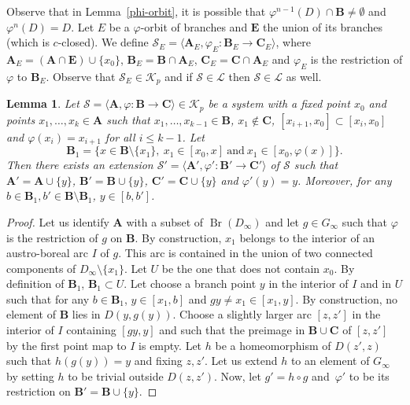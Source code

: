 \documentclass[JEP,XML,SOM,Unicode,NoFloatCountersInSection]{cedram}
\let\mathcal\mathscr
\theoremstyle{plain}
\newtheorem{lem}[thm]{Lemma}
\theoremstyle{definition}
\newcommand{\bA}{{\boldsymbol{A}}}
\newcommand{\bB}{{\boldsymbol{B}}}
\newcommand{\bC}{{\boldsymbol{C}}}
\newcommand{\bE}{{\boldsymbol{E}}}
\newcommand{\cK}{\mathcal{K}}
\newcommand{\cL}{\mathcal{L}}
\newcommand{\cS}{\mathcal{S}}
\DeclareMathOperator{\Br}{Br}
\begin{document}
Observe that in Lemma~\ref{phi-orbit}, it is possible that $\varphi^{n-1}(D)\cap\bB\neq\emptyset$ and $\varphi^n(D)=D$.
Let $E$ be a $\varphi$-orbit of branches and $\bE$ the union of its branches (which is $c$-closed). We define $\cS_E=\langle \bA_E,\varphi_E\colon \bB_E\to \bC_E\rangle$, where $\bA_E=(\bA\cap \bE)\cup\{x_0\}$, $\bB_E=\bB\cap\bA_E$, $\bC_E=\bC\cap\bA_E$ and $\varphi_E$ is the restriction of $\varphi$ to $\bB_E$. Observe
that $\cS_E\in\cK_p$ and if $\cS\in\cL$ then $\cS\in\cL$ as well.

\begin{lem}\label{lem:addfixedpoint} Let $\cS=\langle \bA,\varphi\colon \bB\to\bC\rangle\in \cK_p$ be a system with a fixed point $x_0$ and points $x_1,\dots,x_k\in\bA$ such that $x_1,\dots,x_{k-1}\in\bB$, $x_1\notin \bC$, $[x_{i+1},x_0]\subset [x_i,x_0]$ and $\varphi(x_i)=x_{i+1}$ for all $i\leq k-1$. Let
\[
\bB_1=\{x\in \bB\setminus\{x_1\},\ x_1\in[x_0,x]\ \textrm{and}\ x_1\in[x_0,\varphi(x)]\}.
\]
Then there exists an extension $\cS'=\langle \bA',\varphi'\colon \bB'\to\bC'\rangle$ of $\cS$ such that $\bA'=\bA\cup\{y\}$, $\bB'=\bB\cup\{y\}$, $\bC'=\bC\cup\{y\}$ and $\varphi'(y)=y$. Moreover, for any $b\in \bB_1, b'\in \bB\setminus \bB_1$, $y\in [b,b']$.
\end{lem}

\begin{proof} Let us identify $\bA$ with a subset of $\Br(D_\infty)$ and let $g\in G_\infty$ such that $\varphi$ is the restriction of $g$ on $\bB$. By construction, $x_1$ belongs to the interior of an austro-boreal arc $I$ of $g$. This arc is contained in the union of two connected components of $D_\infty\setminus\{x_1\}$. Let $U$ be the one that does not contain $x_0$. By definition of $\bB_1$, $\bB_1\subset U$. Let choose a branch point $y$ in the interior of $I$ and in $U$ such that for any $b\in \bB_1$, $y\in [x_1,b]$ and $gy\neq x_1\in [x_1,y]$. By construction, no element of $\bB$ lies in $D(y,g(y))$. Choose a slightly larger arc $[z,z']$ in the interior of $I$ containing $[gy,y]$ and such that the preimage in $\bB\cup\bC$ of $[z,z']$ by the first point map to $I$ is empty. Let $h$ be a homeomorphism of $D(z',z)$ such that $h(g(y))=y$ and fixing $z,z'$. Let us extend $h$ to an element of $G_\infty$ by setting $h$ to be trivial outside $D(z,z')$. Now, let $g'=h\circ g$ and~$\varphi'$ to be its restriction on $\bB'=\bB\cup\{y\}$.
\end{proof}
\end{document}
